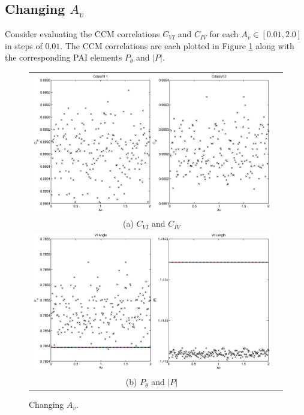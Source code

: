 \documentclass[a4paper,11pt]{article}
\begin{document}
\subsection{Changing $A_v$}
Consider evaluating the CCM correlations $C_{VI}$ and $C_{IV}$ for each $A_v\in[0.01,2.0]$ in steps of $0.01$.  The CCM correlations are each plotted in Figure \ref{fig:Av} along with the corresponding PAI elements $P_\theta$ and $|P|$.
\begin{figure}[H]
\begin{tabular}{cc}
\includegraphics[scale=0.5]{RLCircuitPlots/RLcirc_varyV_amp2.eps} \\
(a) $C_{VI}$ and $C_{IV}$ \\[6pt]
\includegraphics[scale=0.5]{RLCircuitPlots/RLcirc_varyV_amp.eps} \\
(b) $P_\theta$ and $|P|$ \\[6pt]
\end{tabular}
\caption{Changing $A_v$.}
\label{fig:Av}
\end{figure}
\end{document}
